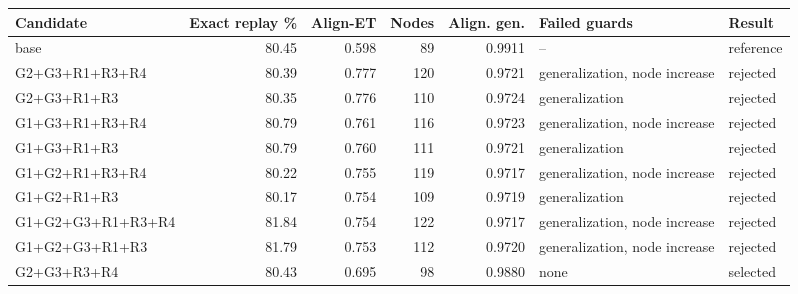 \begin{tabular}{lrrrrll}
\hline
Candidate & Exact replay \% & Align-ET & Nodes & Align. gen. & Failed guards & Result \\
\hline
base & 80.45 & 0.598 & 89 & 0.9911 & -- & reference \\
G2+G3+R1+R3+R4 & 80.39 & 0.777 & 120 & 0.9721 & generalization, node increase & rejected \\
G2+G3+R1+R3 & 80.35 & 0.776 & 110 & 0.9724 & generalization & rejected \\
G1+G3+R1+R3+R4 & 80.79 & 0.761 & 116 & 0.9723 & generalization, node increase & rejected \\
G1+G3+R1+R3 & 80.79 & 0.760 & 111 & 0.9721 & generalization & rejected \\
G1+G2+R1+R3+R4 & 80.22 & 0.755 & 119 & 0.9717 & generalization, node increase & rejected \\
G1+G2+R1+R3 & 80.17 & 0.754 & 109 & 0.9719 & generalization & rejected \\
G1+G2+G3+R1+R3+R4 & 81.84 & 0.754 & 122 & 0.9717 & generalization, node increase & rejected \\
G1+G2+G3+R1+R3 & 81.79 & 0.753 & 112 & 0.9720 & generalization, node increase & rejected \\
G2+G3+R3+R4 & 80.43 & 0.695 & 98 & 0.9880 & none & selected \\
\hline
\end{tabular}

